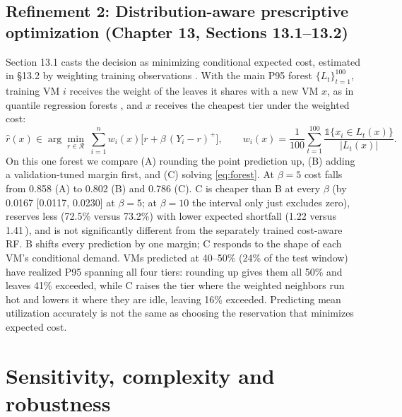 \documentclass[10pt]{article}
\newcommand{\pp}{\,\text{pp}}
\begin{document}
\subsection{Refinement 2: Distribution-aware prescriptive optimization (Chapter 13, Sections 13.1--13.2)}

Section 13.1 casts the decision as minimizing conditional expected cost, estimated in \S13.2 by weighting training observations \citep{bertsimas2020predictive}. With the main P95 forest $\{L_t\}_{t=1}^{100}$, training VM $i$ receives the weight of the leaves it shares with a new VM $x$, as in quantile regression forests \citep{meinshausen2006qrf}, and $x$ receives the cheapest tier under the weighted cost:
\begin{equation}
\hat r(x)\in\arg\min_{r\in\mathcal{R}}\ \sum_{i=1}^{n} w_i(x)\big[r+\beta\,(Y_i-r)^+\big],\qquad
w_i(x)=\frac{1}{100}\sum_{t=1}^{100}\frac{\mathbb{1}\{x_i\in L_t(x)\}}{|L_t(x)|}.
\label{eq:forest}
\end{equation}
On this one forest we compare (A) rounding the point prediction up, (B) adding a validation-tuned margin first, and (C) solving \eqref{eq:forest}. At $\beta=5$ cost falls from 0.858 (A) to 0.802 (B) and 0.786 (C). C is cheaper than B at every $\beta$ (by 0.0167 [0.0117, 0.0230] at $\beta=5$; at $\beta=10$ the interval only just excludes zero), reserves less (72.5\% versus 73.2\%) with lower expected shortfall (1.22 versus 1.41\pp), and is not significantly different from the separately trained cost-aware RF. B shifts every prediction by one margin; C responds to the shape of each VM's conditional demand. VMs predicted at 40--50\% (24\% of the test window) have realized P95 spanning all four tiers: rounding up gives them all 50\% and leaves 41\% exceeded, while C raises the tier where the weighted neighbors run hot and lowers it where they are idle, leaving 16\% exceeded. Predicting mean utilization accurately is not the same as choosing the reservation that minimizes expected cost.

\section{Sensitivity, complexity and robustness}
\label{sec:robust}
\end{document}
